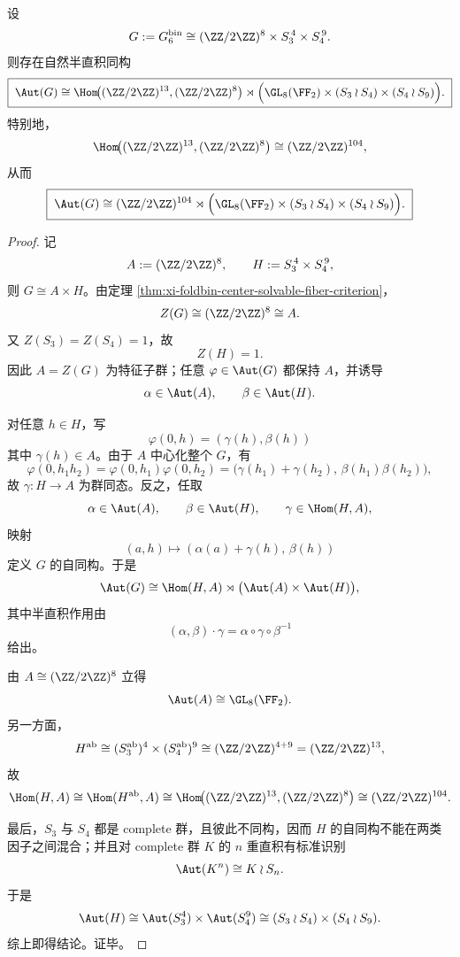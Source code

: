 \begin{theorem}\label{thm:xi-window6-full-automorphism-group-structure}
设
\[
G:=G_6^{\mathrm{bin}}
\cong
(\ZZ/2\ZZ)^8\times S_3^{\,4}\times S_4^{\,9}.
\]
则存在自然半直积同构
\[
\boxed{\;
\Aut(G)
\cong
\Hom\!\bigl((\ZZ/2\ZZ)^{13},(\ZZ/2\ZZ)^8\bigr)
\rtimes
\Bigl(
\GL_8(\FF_2)\times (S_3\wr S_4)\times (S_4\wr S_9)
\Bigr).\;}
\]
特别地，
\[
\Hom\!\bigl((\ZZ/2\ZZ)^{13},(\ZZ/2\ZZ)^8\bigr)\cong (\ZZ/2\ZZ)^{104},
\]
从而
\[
\boxed{\;
\Aut(G)
\cong
(\ZZ/2\ZZ)^{104}
\rtimes
\Bigl(
\GL_8(\FF_2)\times (S_3\wr S_4)\times (S_4\wr S_9)
\Bigr).\;}
\]
\end{theorem}
\begin{proof}
记
\[
A:=(\ZZ/2\ZZ)^8,
\qquad
H:=S_3^{\,4}\times S_4^{\,9},
\]
则 \(G\cong A\times H\)。由定理 \ref{thm:xi-foldbin-center-solvable-fiber-criterion}，
\[
Z(G)\cong (\ZZ/2\ZZ)^8\cong A.
\]
又 \(Z(S_3)=Z(S_4)=1\)，故
\[
Z(H)=1.
\]
因此 \(A=Z(G)\) 为特征子群；任意 \(\varphi\in\Aut(G)\) 都保持 \(A\)，并诱导
\[
\alpha\in\Aut(A),
\qquad
\beta\in\Aut(H).
\]

对任意 \(h\in H\)，写
\[
\varphi(0,h)=(\gamma(h),\beta(h))
\]
其中 \(\gamma(h)\in A\)。由于 \(A\) 中心化整个 \(G\)，有
\[
\varphi(0,h_1h_2)=\varphi(0,h_1)\varphi(0,h_2)
=
\bigl(\gamma(h_1)+\gamma(h_2),\,\beta(h_1)\beta(h_2)\bigr),
\]
故 \(\gamma:H\to A\) 为群同态。反之，任取
\[
\alpha\in\Aut(A),
\qquad
\beta\in\Aut(H),
\qquad
\gamma\in\Hom(H,A),
\]
映射
\[
(a,h)\longmapsto (\alpha(a)+\gamma(h),\,\beta(h))
\]
定义 \(G\) 的自同构。于是
\[
\Aut(G)\cong \Hom(H,A)\rtimes\bigl(\Aut(A)\times\Aut(H)\bigr),
\]
其中半直积作用由
\[
(\alpha,\beta)\cdot \gamma=\alpha\circ \gamma\circ \beta^{-1}
\]
给出。

由 \(A\cong(\ZZ/2\ZZ)^8\) 立得
\[
\Aut(A)\cong \GL_8(\FF_2).
\]
另一方面，
\[
H^{\mathrm{ab}}
\cong
(S_3^{\mathrm{ab}})^4\times (S_4^{\mathrm{ab}})^9
\cong
(\ZZ/2\ZZ)^{4+9}
=(\ZZ/2\ZZ)^{13},
\]
故
\[
\Hom(H,A)
\cong
\Hom(H^{\mathrm{ab}},A)
\cong
\Hom\!\bigl((\ZZ/2\ZZ)^{13},(\ZZ/2\ZZ)^8\bigr)
\cong
(\ZZ/2\ZZ)^{104}.
\]

最后，\(S_3\) 与 \(S_4\) 都是 complete 群，且彼此不同构，因而 \(H\) 的自同构不能在两类因子之间混合；并且对 complete 群 \(K\) 的 \(n\) 重直积有标准识别
\[
\Aut(K^n)\cong K\wr S_n.
\]
于是
\[
\Aut(H)
\cong
\Aut(S_3^4)\times \Aut(S_4^9)
\cong
(S_3\wr S_4)\times (S_4\wr S_9).
\]
综上即得结论。证毕。
\end{proof}

